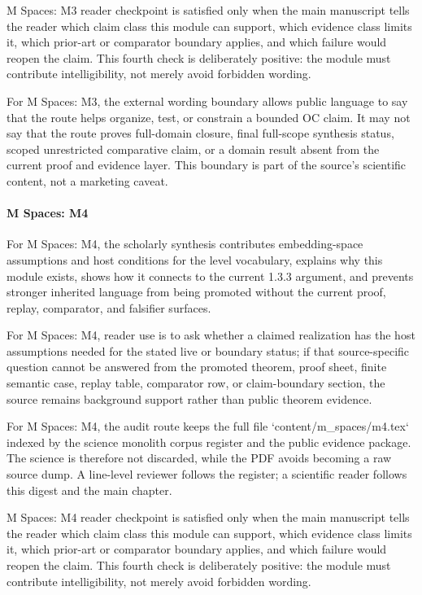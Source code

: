 M Spaces: M3 reader checkpoint is satisfied only when the main manuscript tells the reader which claim class this module can support, which evidence class limits it, which prior-art or comparator boundary applies, and which failure would reopen the claim. This fourth check is deliberately positive: the module must contribute intelligibility, not merely avoid forbidden wording.


For M Spaces: M3, the external wording boundary allows public language to say that the route helps organize, test, or constrain a bounded OC claim. It may not say that the route proves full-domain closure, final full-scope synthesis status, scoped unrestricted comparative claim, or a domain result absent from the current proof and evidence layer. This boundary is part of the source's scientific content, not a marketing caveat.


\paragraph{M Spaces: M4}

For M Spaces: M4, the scholarly synthesis contributes embedding-space assumptions and host conditions for the level vocabulary, explains why this module exists, shows how it connects to the current 1.3.3 argument, and prevents stronger inherited language from being promoted without the current proof, replay, comparator, and falsifier surfaces.


For M Spaces: M4, reader use is to ask whether a claimed realization has the host assumptions needed for the stated live or boundary status; if that source-specific question cannot be answered from the promoted theorem, proof sheet, finite semantic case, replay table, comparator row, or claim-boundary section, the source remains background support rather than public theorem evidence.


For M Spaces: M4, the audit route keeps the full file `content/m\_spaces/m4.tex` indexed by the science monolith corpus register and the public evidence package. The science is therefore not discarded, while the PDF avoids becoming a raw source dump. A line-level reviewer follows the register; a scientific reader follows this digest and the main chapter.


M Spaces: M4 reader checkpoint is satisfied only when the main manuscript tells the reader which claim class this module can support, which evidence class limits it, which prior-art or comparator boundary applies, and which failure would reopen the claim. This fourth check is deliberately positive: the module must contribute intelligibility, not merely avoid forbidden wording.


